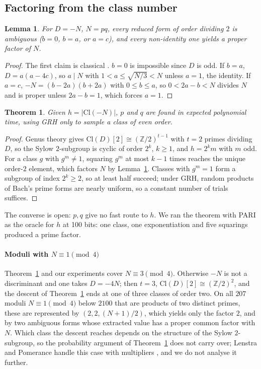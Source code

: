 \documentclass[conference]{IEEEtran}
\newtheorem{theorem}{Theorem}
\newtheorem{lemma}{Lemma}
\newcommand{\Cl}{\mathrm{Cl}}
\newcommand{\Z}{\mathbb{Z}}
\begin{document}
\subsection{Factoring from the class number}
\begin{lemma}\label{lem:amb}
For $D=-N$, $N=pq$, every reduced form of order dividing $2$ is ambiguous ($b=0$, $b=a$, or $a=c$), and every non-identity one yields a proper factor of $N$.
\end{lemma}
\begin{proof}
The first claim is classical \cite{cohen1993}. $b=0$ is impossible since $D$ is odd. If $b=a$, $D=a(a-4c)$, so $a\mid N$ with $1<a\le\sqrt{N/3}<N$ unless $a=1$, the identity. If $a=c$, $-N=(b-2a)(b+2a)$ with $0\le b\le a$, so $0<2a-b<N$ divides $N$ and is proper unless $2a-b=1$, which forces $a=1$.
\end{proof}
\begin{theorem}\label{thm:red}
Given $h=|\Cl(-N)|$, $p$ and $q$ are found in expected polynomial time, using GRH only to sample a class of even order.
\end{theorem}
\begin{proof}
Genus theory gives $\Cl(D)[2]\cong(\Z/2)^{t-1}$ with $t=2$ primes dividing $D$, so the Sylow $2$-subgroup is cyclic of order $2^k$, $k\ge1$, and $h=2^km$ with $m$ odd. For a class $g$ with $g^m\ne1$, squaring $g^m$ at most $k-1$ times reaches the unique order-$2$ element, which factors $N$ by Lemma~\ref{lem:amb}. Classes with $g^m=1$ form a subgroup of index $2^k\ge2$, so at least half succeed; under GRH, random products of Bach's prime forms are nearly uniform, so a constant number of trials suffices.
\end{proof}
The converse is open: $p,q$ give no fast route to $h$. We ran the theorem with PARI \cite{pari} as the oracle for $h$ at 100 bits: one class, one exponentiation and five squarings produced a prime factor.

\paragraph{Moduli with $N\equiv1\pmod4$} Theorem~\ref{thm:red} and our experiments cover $N\equiv3\pmod4$. Otherwise $-N$ is not a discriminant and one takes $D=-4N$; then $t=3$, $\Cl(D)[2]\cong(\Z/2)^2$, and the descent of Theorem~\ref{thm:red} ends at one of three classes of order two. On all $207$ moduli $N\equiv1\pmod4$ below $2100$ that are products of two distinct primes, these are represented by $(2,2,(N+1)/2)$, which yields only the factor $2$, and by two ambiguous forms whose extracted value has a proper common factor with $N$. Which class the descent reaches depends on the structure of the Sylow $2$-subgroup, so the probability argument of Theorem~\ref{thm:red} does not carry over; Lenstra and Pomerance handle this case with multipliers \cite{lenstra1992}, and we do not analyse it further.
\end{document}

